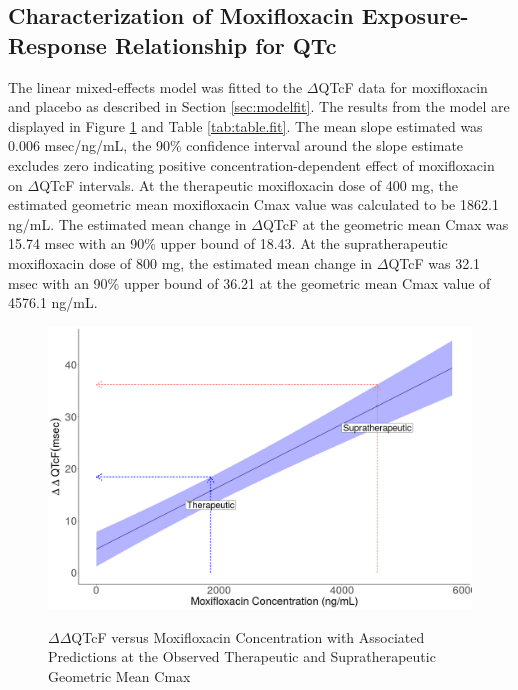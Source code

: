 \documentclass[
]{article}
\begin{document}
\hypertarget{characterization-of-moxifloxacin-exposure-response-relationship-for-qtc-1}{%
\subsection{Characterization of Moxifloxacin Exposure-Response
Relationship for
QTc}\label{characterization-of-moxifloxacin-exposure-response-relationship-for-qtc-1}}

The linear mixed-effects model was fitted to the \(\Delta\)QTcF data for
moxifloxacin and placebo as described in Section \ref{sec:modelfit}. The
results from the model are displayed in Figure \ref{fig:moxifit} and
Table \ref{tab:table.fit}. The mean slope estimated was 0.006
msec/ng/mL, the 90\% confidence interval around the slope estimate
excludes zero indicating positive concentration-dependent effect of
moxifloxacin on \(\Delta\)QTcF intervals. At the therapeutic
moxifloxacin dose of 400 mg, the estimated geometric mean moxifloxacin
Cmax value was calculated to be 1862.1 ng/mL. The estimated mean change
in \(\Delta\)QTcF at the geometric mean Cmax was 15.74 msec with an 90\%
upper bound of 18.43. At the supratherapeutic moxifloxacin dose of 800
mg, the estimated mean change in \(\Delta\)QTcF was 32.1 msec with an
90\% upper bound of 36.21 at the geometric mean Cmax value of 4576.1
ng/mL.

\begin{figure}[H]
\caption{$\Delta \Delta$QTcF versus Moxifloxacin Concentration with Associated Predictions at the Observed Therapeutic and Supratherapeutic Geometric Mean Cmax} 
\includegraphics[width=\textwidth]{../Report/Figures/moxifit.png}
\label{fig:moxifit}
\end{figure}
\end{document}
